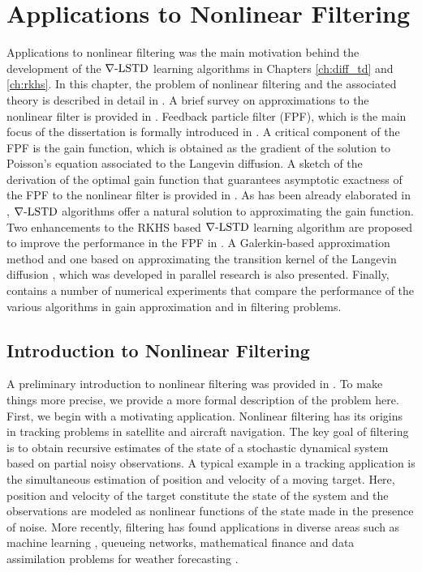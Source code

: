 \chapter{Applications to Nonlinear Filtering} 
\label{ch:filtering}
Applications to nonlinear filtering was the main motivation behind the development of the $\nabla\text{-LSTD}$ learning algorithms in Chapters \ref{ch:diff_td} and \ref{ch:rkhs}. In this chapter, the problem of nonlinear filtering and the associated theory is described in detail in . A brief survey on approximations to the nonlinear filter is provided in . Feedback particle filter (FPF), which is the main focus of the dissertation is formally introduced in . A critical component of the FPF is the gain function, which is obtained as the gradient of the solution to Poisson's equation associated to the Langevin diffusion. A sketch of the derivation of the optimal gain function that guarantees asymptotic exactness of the FPF to the nonlinear filter is provided in . As has been already elaborated in , $\nabla\text{-LSTD}$ algorithms offer a natural solution to approximating the gain function. Two enhancements to the RKHS based $\nabla\text{-LSTD}$ learning algorithm are proposed to improve the performance in the FPF in . A Galerkin-based approximation method and one based on approximating the transition kernel of the Langevin diffusion \cite{tagmeh16a}, which was developed in parallel research is also presented. Finally,  contains a number of numerical experiments that compare the performance of the various algorithms in gain approximation and in filtering problems.  

\section{Introduction to Nonlinear Filtering} 
\label{s:nl_filtering_intro}
A preliminary introduction to nonlinear filtering was provided in . To make things more precise, we provide a more formal description of the problem here. First, we begin with a motivating application. Nonlinear filtering has its origins in tracking problems in satellite and aircraft navigation. The key goal of filtering is to obtain recursive estimates of the state of a stochastic dynamical system based on partial noisy observations. A typical example in a tracking application is the simultaneous estimation of position and velocity of a moving target. Here, position and velocity of the target constitute the state of the system and the observations are modeled as nonlinear functions of the state made in the presence of noise. More recently, filtering has found applications in diverse areas such as machine learning \cite{bishop06}, queueing networks, mathematical finance \cite{brihan08} and data assimilation problems for weather forecasting \cite{eve94}. 

